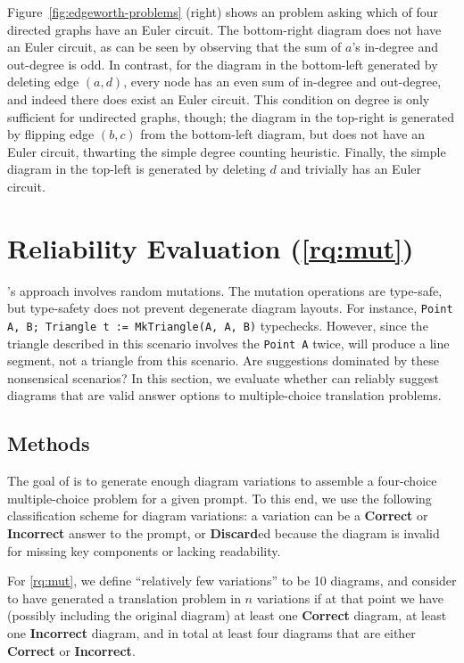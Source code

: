 Figure~\ref{fig:edgeworth-problems} (right) shows an \Edgeworth problem asking which of four directed graphs have an Euler circuit. The bottom-right diagram does not have an Euler circuit, as can be seen by observing that the sum of $a$'s in-degree and out-degree is odd. In contrast, for the diagram in the bottom-left generated by deleting edge $(a, d)$, every node has an even sum of in-degree and out-degree, and indeed there does exist an Euler circuit. This condition on degree is only sufficient for undirected graphs, though; the diagram in the top-right is generated by flipping edge $(b, c)$ from the bottom-left diagram, but does not have an Euler circuit, thwarting the simple degree counting heuristic. Finally, the simple diagram in the top-left is generated by deleting $d$ and trivially has an Euler circuit. 



\section{Reliability Evaluation (\ref{rq:mut})}
\label{sec:reliability-eval}

\Edgeworth's approach involves random mutations. The mutation operations are type-safe, but type-safety does not prevent degenerate diagram layouts. For instance, \texttt{Point A, B; Triangle t := MkTriangle(A, A, B)} typechecks. However, since the triangle described in this scenario involves the \texttt{Point A} twice, \Edgeworth will produce a line segment, not a triangle from this scenario. Are \Edgeworth suggestions dominated by these nonsensical scenarios? In this section, we evaluate whether \Edgeworth can reliably suggest diagrams that are valid answer options to multiple-choice translation problems. 

\subsection{Methods}
\label{sec:reliability-method}

The goal of \Edgeworth is to generate enough diagram variations to assemble a four-choice multiple-choice problem for a given prompt. To this end, we use the following classification scheme for diagram variations: a variation can be a \textbf{Correct} or \textbf{Incorrect} answer to the prompt, or \textbf{Discard}ed because the diagram is invalid for missing key components or lacking readability.

For \ref{rq:mut}, we define ``relatively few variations'' to be 10 diagrams, and consider \Edgeworth to have generated a translation problem in $n$ variations if at that point we have (possibly including the original diagram) at least one \textbf{Correct} diagram, at least one \textbf{Incorrect} diagram, and in total at least four diagrams that are either \textbf{Correct} or \textbf{Incorrect}.

